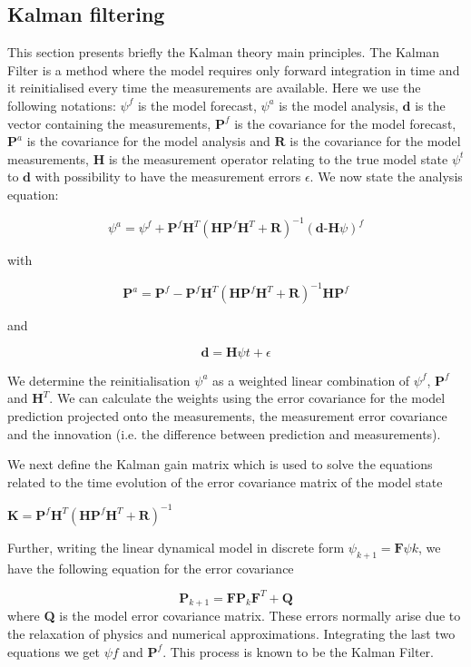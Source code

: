 \documentclass[a4,12pt]{article}
\numberwithin{equation}{section}
\begin{document}
\subsection{Kalman filtering}
This section presents briefly the Kalman theory main principles.
The Kalman Filter is a method where the model requires only forward integration in time and it reinitialised every time the measurements are available. Here we use the following notations: $\psi^{f}$ is the model forecast, $\psi^{a}$ is the model analysis, $\textbf{d}$ is the vector containing the measurements, $\textbf{P}^{f}$ is the covariance for the model forecast, $\textbf{P}^{a}$ is the covariance for the model analysis and $\textbf{R}$ is the covariance for the model measurements, $\textbf{H}$ is the measurement operator relating to the true model state $\psi ^{t}$ to $\textbf{d}$ with possibility to have the measurement errors $\epsilon$. We now state the analysis equation:

$$\psi ^{a} = \psi ^{f} + \textbf{P} ^{f}\textbf{H} ^{T}(\textbf{HP} ^{f}\textbf{H} ^{T}+\textbf{R}) ^{-1}(\textbf{d-H}\psi) ^{f}$$

with

$$\textbf{P}^{a} = \textbf{P}^{f} - \textbf{P}^{f}\textbf{H}^{T}(\textbf{HP}^{f}\textbf{H}^{T}+\textbf{R})^{-1}\textbf{HP}^{f} $$

and 

$$\textbf{d} = \textbf{H}\psi{t} + \epsilon$$

We determine the reinitialisation $\psi^{a}$ as a weighted linear combination of $\psi^{f}$, $\textbf{P}^{f}$ and $\textbf{H}^{T}$. We can calculate the weights using the error covariance for the model prediction projected onto the measurements, the measurement error covariance and the innovation (i.e. the difference between prediction and measurements).     

We next define the Kalman gain matrix which is used to solve the equations related to the time evolution of the error covariance matrix of the model state

$\textbf{K} = \textbf{P}^{f}\textbf{H}^{T}(\textbf{H}\textbf{P}^{f}\textbf{H}^{T}+\textbf{R})^{-1}$

Further, writing the linear dynamical model in discrete form $\psi_{k+1}=\textbf{F}\psi{k}$, we have the following equation for the error covariance

$$\textbf{P}_{k+1}=\textbf{F}\textbf{P}_{k}\textbf{F}^{T}+\textbf{Q}$$
where \textbf{Q} is the model error covariance matrix. These errors normally arise due to the relaxation of physics and numerical approximations. Integrating the last two equations we get $\psi{f}$ and $\textbf{P}^{f}$. This process is known to be the Kalman Filter.
\end{document}
